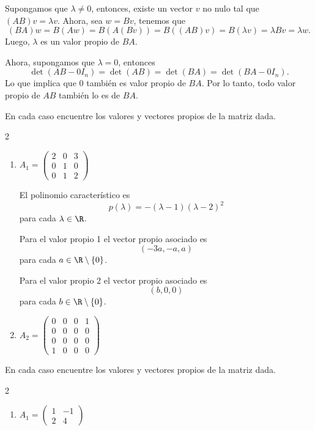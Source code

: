 \documentclass[10pt,a4]{examenEPN}
\begin{document}
\begin{preguntas}
\begin{respuesta}\hspace{0pt}

Supongamos que $\lambda\neq0$, entonces, existe un vector $v$ no nulo tal que $(AB)v=\lambda v$. Ahora, sea $w = Bv$, tenemos que
\[
    (BA)w = B(Aw) = B(A(Bv)) = B((AB)v) = B(\lambda v) = \lambda Bv = \lambda w.
\]
Luego, $\lambda$ es un valor propio de $BA$.

Ahora, supongamos que $\lambda=0$, entonces
\[
    \det(AB - 0I_{n}) = \det(AB) = \det(BA) = \det(BA - 0I_{n}).
\]
Lo que implica que 0 también es valor propio de $BA$. Por lo tanto, todo valor propio de $AB$ también lo es de $BA$.\qedhere
\end{respuesta}
\item En cada caso encuentre los valores y vectores propios de la matriz dada.
\begin{multicols}{2}
\begin{enumerate}

\item $A_{1} = \begin{pmatrix}2&0&3\\0&1&0\\0&1&2\end{pmatrix}$

\begin{respuesta}\hspace{0pt} El polinomio característico es
\[
    p(\lambda) = - (\lambda - 1)(\lambda - 2)^{2}
\]
para cada $\lambda\in\R$. 

Para el valor propio 1 el vector propio asociado es
\[
    (-3a, - a, a)
\]
para cada $a\in\R\setminus\{0\}$.

Para el valor propio 2 el vector propio asociado es
\[
    (b, 0, 0)
\]
para cada $b\in\R\setminus\{0\}$.
\end{respuesta}
\item $A_{2} = \begin{pmatrix}0&0&0&1\\0&0&0&0\\0&0&0&0\\1&0&0&0\end{pmatrix}$
\end{enumerate}
\end{multicols}
\item En cada caso encuentre los valores y vectores propios de la matriz dada.
\begin{multicols}{2}
\begin{enumerate}
\item $A_{1} = \begin{pmatrix}1&-1\\2&4\end{pmatrix}$


\end{enumerate}
\end{multicols}
\end{preguntas}
\end{document}
